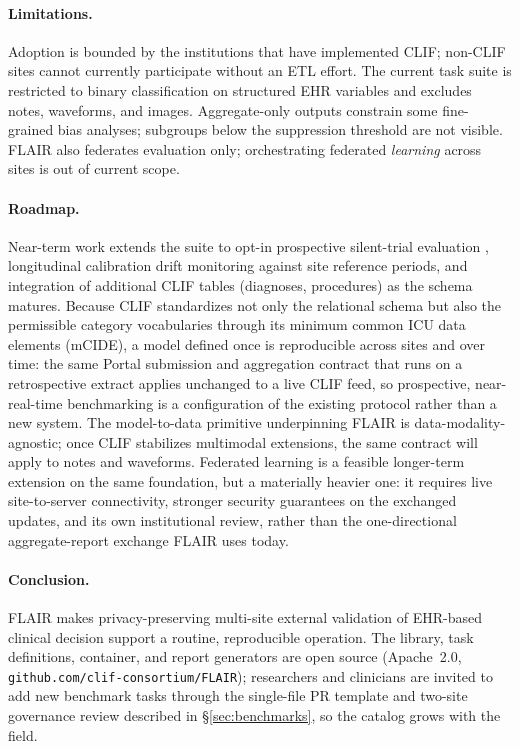 \paragraph{Limitations.} Adoption is bounded by the institutions that
have implemented CLIF; non-CLIF sites cannot currently participate
without an ETL effort. The current task suite is restricted to binary
classification on structured EHR variables and excludes notes,
waveforms, and images. Aggregate-only outputs constrain some
fine-grained bias analyses; subgroups below the suppression threshold
are not visible. FLAIR also federates evaluation only; orchestrating
federated \emph{learning} across sites is out of current scope.

\paragraph{Roadmap.} Near-term work extends the suite to opt-in
prospective silent-trial evaluation \citep{joshi2025silenttrials},
longitudinal calibration drift monitoring against site reference
periods, and integration of additional CLIF tables (diagnoses,
procedures) as the schema matures. Because CLIF standardizes not only
the relational schema but also the permissible category vocabularies
through its minimum common ICU data elements (mCIDE), a model defined
once is reproducible across sites and over time: the same Portal
submission and aggregation contract that runs on a retrospective
extract applies unchanged to a live CLIF feed, so prospective,
near-real-time benchmarking is a configuration of the existing
protocol rather than a new system. The model-to-data primitive
underpinning FLAIR is data-modality-agnostic; once CLIF stabilizes
multimodal extensions, the same contract will apply to notes and
waveforms. Federated learning is a feasible longer-term extension on
the same foundation, but a materially heavier one: it requires live
site-to-server connectivity, stronger security guarantees on the
exchanged updates, and its own institutional review, rather than the
one-directional aggregate-report exchange FLAIR uses today.

\paragraph{Conclusion.} FLAIR makes privacy-preserving multi-site
external validation of EHR-based clinical decision support a routine,
reproducible operation. The library, task definitions, container, and
report generators are open source (Apache~2.0,
\texttt{github.com/clif-consortium/FLAIR}); researchers and clinicians
are invited to add new benchmark tasks through the single-file PR
template and two-site governance review described in
\S\ref{sec:benchmarks}, so the catalog grows with the field.
